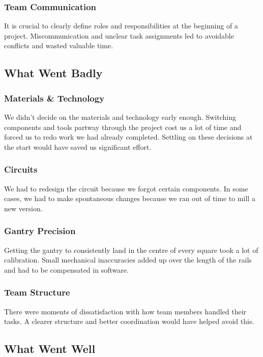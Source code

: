 \documentclass[10pt]{article}
\begin{document}
\subsubsection*{Team Communication}
It is crucial to clearly define roles and responsibilities at the beginning of a project. Miscommunication and unclear task assignments led to avoidable conflicts and wasted valuable time.

\newpage

\subsection{What Went Badly}

\subsubsection*{Materials & Technology}
We didn't decide on the materials and technology early enough. Switching components and tools partway through the project cost us a lot of time and forced us to redo work we had already completed. Settling on these decisions at the start would have saved us significant effort.

\subsubsection*{Circuits}
We had to redesign the circuit because we forgot certain components. In some cases, we had to make spontaneous changes because we ran out of time to mill a new version.

\subsubsection*{Gantry Precision}
Getting the gantry to consistently land in the centre of every square took a lot of calibration. Small mechanical inaccuracies added up over the length of the rails and had to be compensated in software.

\subsubsection*{Team Structure}
There were moments of dissatisfaction with how team members handled their tasks. A clearer structure and better coordination would have helped avoid this.

\subsection{What Went Well}
\end{document}
